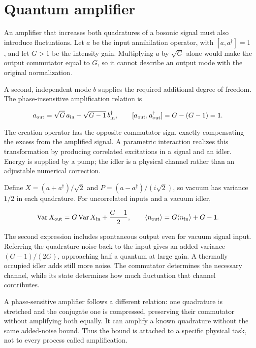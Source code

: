 \documentclass[11pt,oneside]{book}
\newenvironment{centeredalign}{\[\begin{gathered}[c]}{\end{gathered}\]}
\begin{document}
\clearpage

\section{Quantum amplifier}

\label{topic:quantum-amplifier}

An amplifier that increases both quadratures of a bosonic signal must also introduce fluctuations. Let \(a\) be the input annihilation operator, with \([a,a^\dagger]=1\), and let \(G>1\) be the intensity gain. Multiplying \(a\) by \(\sqrt G\) alone would make the output commutator equal to \(G\), so it cannot describe an output mode with the original normalization.

A second, independent mode \(b\) supplies the required additional degree of freedom. The phase-insensitive amplification relation is

\begin{centeredalign}
a_{\rm out}=\sqrt G\,a_{\rm in}+\sqrt{G-1}\,b_{\rm in}^\dagger,
\qquad [a_{\rm out},a_{\rm out}^\dagger]=G-(G-1)=1.
\end{centeredalign}

The creation operator has the opposite commutator sign, exactly compensating the excess from the amplified signal. A parametric interaction realizes this transformation by producing correlated excitations in a signal and an idler. Energy is supplied by a pump; the idler is a physical channel rather than an adjustable numerical correction.

Define \(X=(a+a^\dagger)/\sqrt2\) and \(P=(a-a^\dagger)/(i\sqrt2)\), so vacuum has variance \(1/2\) in each quadrature. For uncorrelated inputs and a vacuum idler,

\begin{centeredalign}
\operatorname{Var}X_{\rm out}=G\operatorname{Var}X_{\rm in}+\frac{G-1}{2},
\qquad \langle n_{\rm out}\rangle=G\langle n_{\rm in}\rangle+G-1.
\end{centeredalign}

The second expression includes spontaneous output even for vacuum signal input. Referring the quadrature noise back to the input gives an added variance \((G-1)/(2G)\), approaching half a quantum at large gain. A thermally occupied idler adds still more noise. The commutator determines the necessary channel, while its state determines how much fluctuation that channel contributes.

A phase-sensitive amplifier follows a different relation: one quadrature is stretched and the conjugate one is compressed, preserving their commutator without amplifying both equally. It can amplify a known quadrature without the same added-noise bound. Thus the bound is attached to a specific physical task, not to every process called amplification.
\end{document}
